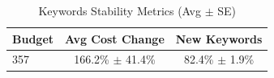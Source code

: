 \begin{table}[htbp]
\centering
\caption{Keywords Stability Metrics (Avg $\pm$ SE)}
\begin{tabular}{lcc}
\toprule
Budget & Avg Cost Change & New Keywords \\
\midrule
357 & 166.2\% $\pm$ 41.4\% & 82.4\% $\pm$ 1.9\% \\
\bottomrule
\end{tabular}
\end{table}